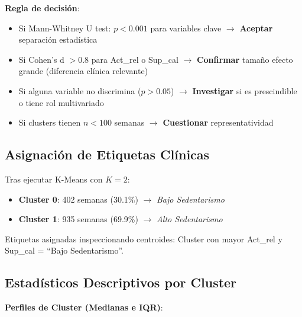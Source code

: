 \documentclass[12pt,letterpaper,twoside]{report}
\begin{document}
\begin{reglabox}
\textbf{Regla de decisión}:

\begin{itemize}[noitemsep]
    \item Si Mann-Whitney U test: $p < 0.001$ para variables clave $\to$ \textbf{Aceptar} separación estadística
    \item Si Cohen's d $> 0.8$ para Act\_rel o Sup\_cal $\to$ \textbf{Confirmar} tamaño efecto grande (diferencia clínica relevante)
    \item Si alguna variable no discrimina ($p > 0.05$) $\to$ \textbf{Investigar} si es prescindible o tiene rol multivariado
    \item Si clusters tienen $n < 100$ semanas $\to$ \textbf{Cuestionar} representatividad
\end{itemize}
\end{reglabox}

\subsection{Asignación de Etiquetas Clínicas}

Tras ejecutar K-Means con $K=2$:
\begin{itemize}[noitemsep]
    \item \textbf{Cluster 0}: 402 semanas (30.1\%) $\to$ \textit{Bajo Sedentarismo}
    \item \textbf{Cluster 1}: 935 semanas (69.9\%) $\to$ \textit{Alto Sedentarismo}
\end{itemize}

Etiquetas asignadas inspeccionando centroides: Cluster con mayor Act\_rel y Sup\_cal = ``Bajo Sedentarismo''.

\subsection{Estadísticos Descriptivos por Cluster}

\begin{calculobox}
\textbf{Perfiles de Cluster (Medianas e IQR)}:

\begin{table}[H]
\centering
\caption{Perfiles de Cluster: Estadísticos Descriptivos}
\label{tab:cluster_profiles}
\end{table}
\end{calculobox}
\end{document}
